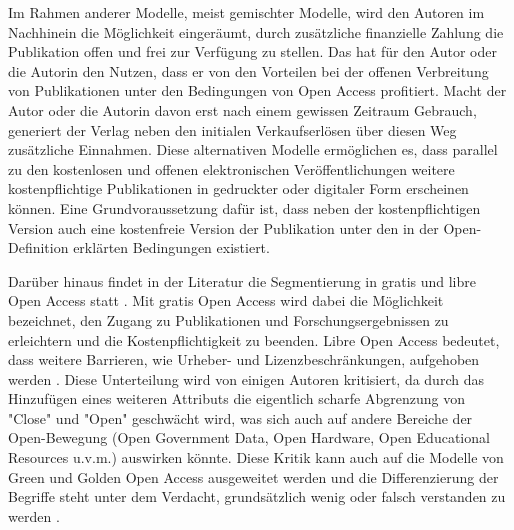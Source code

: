 Im Rahmen anderer Modelle, meist gemischter Modelle, wird den Autoren im Nachhinein die Möglichkeit eingeräumt, durch zusätzliche finanzielle Zahlung die Publikation offen und frei zur Verfügung zu stellen\cite{Lewis_2012}. Das hat für den Autor oder die Autorin den Nutzen, dass er von den Vorteilen bei der offenen Verbreitung von Publikationen unter den Bedingungen von Open Access profitiert. Macht der Autor oder die Autorin davon erst nach einem gewissen Zeitraum Gebrauch, generiert der Verlag neben den initialen Verkaufserlösen über diesen Weg zusätzliche Einnahmen. Diese alternativen Modelle ermöglichen es, dass parallel zu den kostenlosen und offenen elektronischen Veröffentlichungen weitere kostenpflichtige Publikationen in gedruckter oder digitaler Form erscheinen können. Eine Grundvoraussetzung dafür ist, dass neben der kostenpflichtigen Version auch eine kostenfreie Version der Publikation unter den in der Open-Definition erklärten Bedingungen existiert.

Darüber hinaus findet in der Literatur die Segmentierung in gratis und libre Open Access statt \cite{Eve_2014} \cite{Naeder_2010} \cite{Mounce_2015}. Mit gratis Open Access wird dabei die Möglichkeit bezeichnet, den Zugang zu Publikationen und Forschungsergebnissen zu erleichtern und die Kostenpflichtigkeit zu beenden. Libre Open Access bedeutet, dass weitere Barrieren, wie Urheber- und Lizenzbeschränkungen, aufgehoben werden \cite{Adema_2014}. Diese Unterteilung wird von einigen Autoren kritisiert, da durch das Hinzufügen eines weiteren Attributs die eigentlich scharfe Abgrenzung von "Close" und "Open" geschwächt wird, was sich auch auf andere Bereiche der Open-Bewegung (Open Government Data, Open Hardware, Open Educational Resources‎ u.v.m.) auswirken könnte. Diese Kritik kann auch auf die Modelle von Green und Golden Open Access ausgeweitet werden und die Differenzierung der Begriffe steht unter dem Verdacht, grundsätzlich wenig oder falsch verstanden zu werden \cite{Mounce_2015}.

